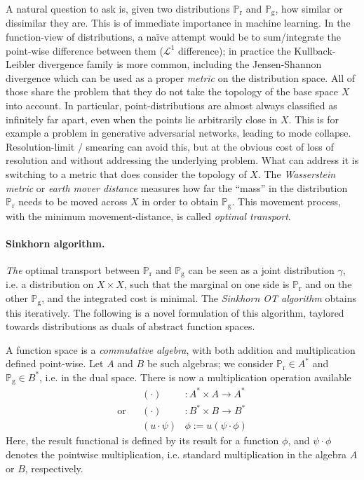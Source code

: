\documentclass[a4paper]{easychair}
\begin{document}
\newcommand{\marg}[1]{\mathbb{P}_\mathrm{#1}}
A natural question to ask is, given two distributions $\marg r$ and $\marg g$, how similar or dissimilar they are. This is of immediate importance in machine learning. In the function-view of distributions, a naïve attempt would be to sum/integrate the point-wise difference between them ($\mathcal{L}^1$ difference); in practice the Kullback-Leibler\cite{Kullback_1951} divergence family is more common, including the Jensen-Shannon divergence which can be used as a proper \emph{metric} on the distribution space.
 All of those share the problem that they do not take the topology of the base space $X$ into account. In particular, point-distributions are almost always classified as infinitely far apart, even when the points lie arbitrarily close in $X$. This is for example a problem in generative adversarial networks, leading to mode collapse. Resolution-limit / smearing can avoid this, but at the obvious cost of loss of resolution and without addressing the underlying problem.
What can address it\cite{pmlr-v70-arjovsky17a} is switching to a metric that does consider the topology of $X$. The \emph{Wasserstein metric} or \emph{earth mover distance} measures how far the “mass” in the distribution $\marg r$ needs to be moved across $X$ in order to obtain $\marg g$. This movement process, with the minimum movement-distance, is called \emph{optimal transport}.

\paragraph{Sinkhorn algorithm.} \emph{The} optimal transport between $\marg r$ and $\marg g$ can be seen as a joint distribution $\gamma$, i.e. a distribution on $X\times X$, such that the marginal on one side is $\marg r$ and on the other $\marg g$, and the integrated cost is minimal.
The \emph{Sinkhorn OT algorithm}\cite{CuturiSinkhornLightspeed} obtains this iteratively. The following is a novel formulation of this algorithm, taylored towards distributions as duals of abstract function spaces.

A function space is a \emph{commutative algebra}, with both addition and multiplication defined point-wise. Let $A$ and $B$ be such algebras; we consider $\marg r \in A^\ast$ and $\marg g \in B^\ast$, i.e. in the dual space. There is now a multiplication operation available
\[\begin{aligned}
            && (\cdot) &: A^\ast \times A \to A^\ast
 \\\text{or}&& (\cdot) &: B^\ast \times B \to B^\ast
 \\         && (u\cdot\psi)& \phi := u(\psi\cdot\phi)
\end{aligned}\]
Here, the result functional is defined by its result for a function $\phi$, and $\psi\cdot\phi$ denotes the pointwise multiplication, i.e. standard multiplication in the algebra $A$ or $B$, respectively.
\end{document}
